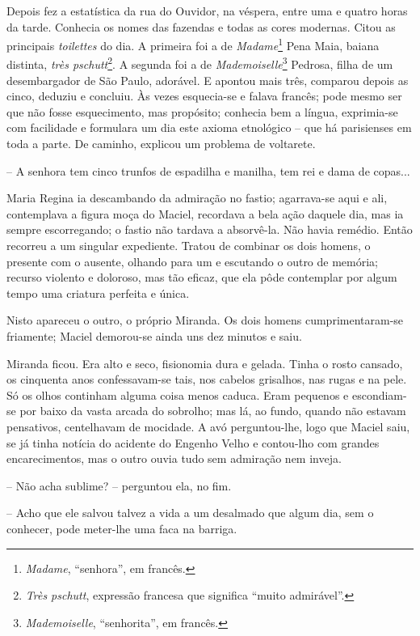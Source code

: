Depois fez a estatística da rua do Ouvidor, na véspera, entre uma e
quatro horas da tarde. Conhecia os nomes das fazendas e todas as cores
modernas. Citou as principais \emph{toilettes} do dia. A primeira foi a
de \emph{Madame}\footnote{\emph{Madame}, ``senhora'', em francês.} Pena
Maia, baiana distinta, \emph{très pschutt}\footnote{\emph{Très pschutt},
  expressão francesa que significa ``muito admirável''.}. A segunda foi
a de \emph{Mademoiselle}\footnote{\emph{Mademoiselle}, ``senhorita'', em
  francês.} Pedrosa, filha de um desembargador de São Paulo, adorável. E
apontou mais três, comparou depois as cinco, deduziu e concluiu. Às
vezes esquecia-se e falava francês; pode mesmo ser que não fosse
esquecimento, mas propósito; conhecia bem a língua, exprimia-se com
facilidade e formulara um dia este axioma etnológico -- que há
parisienses em toda a parte. De caminho, explicou um problema de
voltarete.

-- A senhora tem cinco trunfos de espadilha e manilha, tem rei e dama de
copas...

Maria Regina ia descambando da admiração no fastio; agarrava-se aqui e
ali, contemplava a figura moça do Maciel, recordava a bela ação daquele
dia, mas ia sempre escorregando; o fastio não tardava a absorvê-la. Não
havia remédio. Então recorreu a um singular expediente. Tratou de
combinar os dois homens, o presente com o ausente, olhando para um e
escutando o outro de memória; recurso violento e doloroso, mas tão
eficaz, que ela pôde contemplar por algum tempo uma criatura perfeita e
única.

Nisto apareceu o outro, o próprio Miranda. Os dois homens
cumprimentaram-se friamente; Maciel demorou-se ainda uns dez minutos e
saiu.

Miranda ficou. Era alto e seco, fisionomia dura e gelada. Tinha o rosto
cansado, os cinquenta anos confessavam-se tais, nos cabelos grisalhos,
nas rugas e na pele. Só os olhos continham alguma coisa menos caduca.
Eram pequenos e escondiam-se por baixo da vasta arcada do sobrolho; mas
lá, ao fundo, quando não estavam pensativos, centelhavam de mocidade. A
avó perguntou-lhe, logo que Maciel saiu, se já tinha notícia do acidente
do Engenho Velho e contou-lho com grandes encarecimentos, mas o outro
ouvia tudo sem admiração nem inveja.

-- Não acha sublime? -- perguntou ela, no fim.

-- Acho que ele salvou talvez a vida a um desalmado que algum dia, sem o
conhecer, pode meter-lhe uma faca na barriga.

